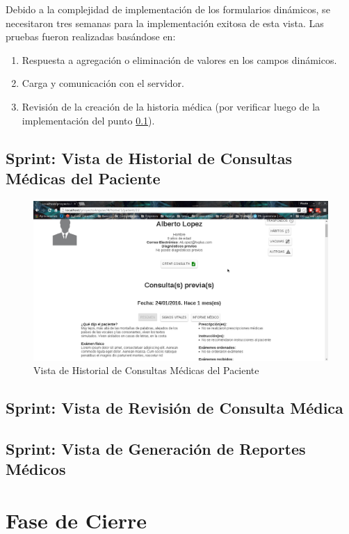    Debido a la complejidad de implementación de los formularios dinámicos, se necesitaron tres semanas para la implementación exitosa de esta vista. Las pruebas fueron realizadas basándose en:
    
    \begin{enumerate}
        \item Respuesta a agregación o eliminación de valores en los campos dinámicos.
        \item Carga y comunicación con el servidor.
        \item Revisión de la creación de la historia médica (por verificar luego de la implementación del punto \ref{historial-medico}).
    \end{enumerate}
    
    \subsection{Sprint: Vista de Historial de Consultas Médicas del Paciente}
    \label{historial-medico}
    
    \begin{figure}[htbp!]
        \begin{center}
            \includegraphics[width=.9\textwidth]{figures/p11}
        \end{center}
        \caption{Vista de Historial de Consultas Médicas del Paciente}
        \label{consultas}
    \end{figure}
    
    \subsection{Sprint: Vista de Revisión de Consulta Médica}
    \subsection{Sprint: Vista de Generación de Reportes Médicos}
    
    
\section{Fase de Cierre}
    